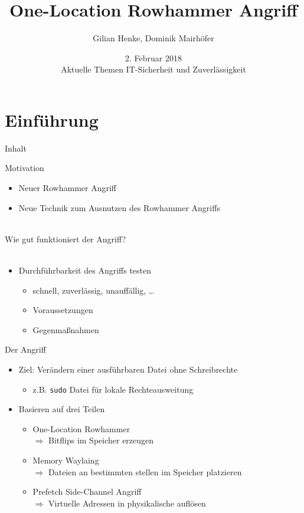 \documentclass[german,10pt,xcolor=colortbl,compress
]{beamer}
\title{One-Location Rowhammer Angriff}
\date[]{2. Februar 2018\\[1ex] Aktuelle Themen IT-Sicherheit und Zuverlässigkeit}
\author[]{Gilian Henke, Dominik Mairhöfer}
\begin{document}
\section{Einführung}
\maketitle


\begin{frame}{Inhalt}
	\tableofcontents
\end{frame}

\begin{frame}{Motivation}

\begin{itemize}
	\item Neuer Rowhammer Angriff
	\item Neue Technik zum Ausnutzen des Rowhammer Angriffs
\end{itemize}
\pause
~\\
Wie gut funktioniert der Angriff?
~\\~\\
\begin{itemize}
	\item Durchführbarkeit des Angriffs testen
	\begin{itemize}
		\item schnell, zuverlässig, unauffällig, \dots
		\item Voraussetzungen
		\item Gegenmaßnahmen
	\end{itemize}
\end{itemize}

\end{frame}

\begin{frame}{Der Angriff}

\begin{itemize}
	\item Ziel: Verändern einer ausführbaren Datei ohne Schreibrechte
	\begin{itemize}
		\item z.B. \texttt{sudo} Datei für lokale Rechteausweitung
	\end{itemize}
	\item Basieren auf drei Teilen
	\begin{itemize}
		\item One-Location Rowhammer\\
		$ \Rightarrow $ Bitflips im Speicher erzeugen
		
		\item Memory Waylaing\\
		$ \Rightarrow $ Dateien an bestimmten stellen im Speicher platzieren
		
		\item Prefetch Side-Channel Angriff\\
		$ \Rightarrow $ Virtuelle Adressen in physikalische auflösen
	\end{itemize}
\end{itemize}

\end{frame}
\end{document}
